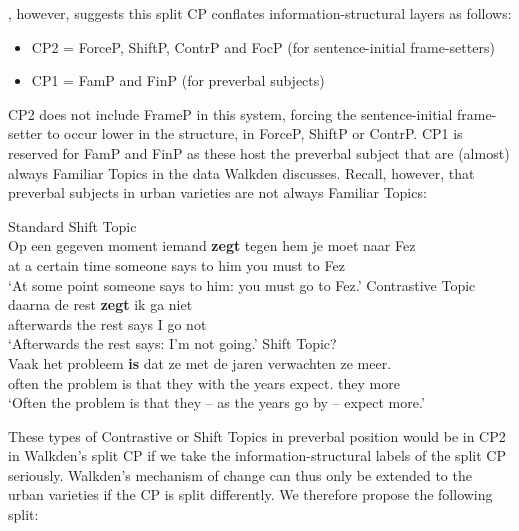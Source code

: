 \documentclass[output=paper]{langsci/langscibook}
\begin{document}
\textcite{Walkden:2017}, however, suggests this split CP conflates
information-struc\-tural layers as follows:

\begin{itemize}

    \item CP2 = ForceP, ShiftP, ContrP and FocP (for sentence-initial
        frame-setters)

    \item CP1 = FamP and FinP (for preverbal subjects)\\

\end{itemize}

\noindent CP2 does not include FrameP in this system, forcing the
sentence-initial frame-setter to occur lower in the structure, in ForceP,
ShiftP or ContrP. CP1 is reserved for FamP and FinP as these host the preverbal
subject that are (almost) always Familiar Topics in the data Walkden discusses.
Recall, however, that preverbal subjects in  urban varieties are not
always Familiar Topics:

\ea Standard 
    \ea Shift Topic\\
    \gll\label{eexsbjnpc}Op een gegeven moment iemand \textbf{zegt} tegen hem je moet naar Fez\\
    at a certain time someone says to him you must to Fez\\
    \trans \enquote*{At some point someone says to him: you must go to Fez.}
    \ex Contrastive Topic\\
    \gll\label{eexsbjnpd}daarna de rest \textbf{zegt} ik ga niet\\
    afterwards the rest says I go not\\
    \trans \enquote*{Afterwards the rest says: I'm not going.}
    \ex Shift Topic?\\
    \gll\label{eexsbjnpe}Vaak het probleem \textbf{is} dat ze met de jaren verwachten ze meer.\\
    often the problem is that they with the years expect.\Pl{} they more\\
    \trans \enquote*{Often the problem is that they -- as the years go by -- expect more.}
    \z
\z

\noindent These types of Contrastive or Shift Topics in preverbal position
would be in CP2 in Walkden's split CP if we take the information-structural
labels of the split CP seriously. Walkden's mechanism of change can thus only be
extended to the  urban varieties if the CP is split differently. We
therefore propose the following split:
\end{document}
